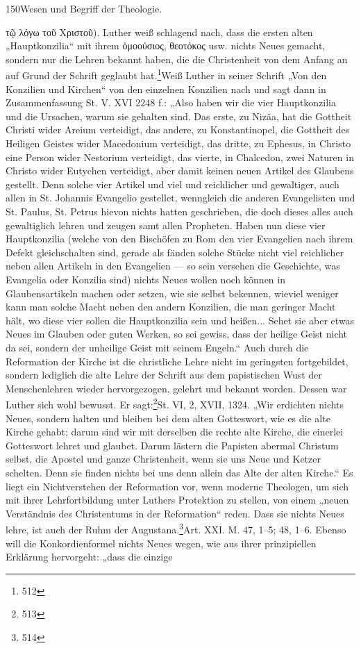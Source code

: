 150\hfill Wesen und Begriff der Theologie.\par{} τῷ λόγω τοῦ Χριστοῦ). Luther weiß schlagend nach, dass die ersten alten „Hauptkonzilia“ mit ihrem ὁμοούσιος, θεοτόκος usw. nichts Neues gemacht, sondern nur die Lehren bekannt haben, die die Christenheit von dem Anfang an auf Grund der Schrift geglaubt hat.\footnote{512}{Weiß Luther in seiner Schrift „Von den Konzilien und Kirchen“ von den einzelnen Konzilien nach und sagt dann in Zusammenfassung St. V. XVI 2248 f.: „Also haben wir die vier Hauptkonzilia und die Ursachen, warum sie gehalten sind. Das erste, zu Nizäa, hat die Gottheit Christi wider Areium verteidigt, das andere, zu Konstantinopel, die Gottheit des Heiligen Geistes wider Macedonium verteidigt, das dritte, zu Ephesus, in Christo eine Person wider Nestorium verteidigt, das vierte, in Chalcedon, zwei Naturen in Christo wider Eutychen verteidigt, aber damit keinen neuen Artikel des Glaubens gestellt. Denn solche vier Artikel und viel und reichlicher und gewaltiger, auch allen in St. Johannis Evangelio gestellet, wenngleich die anderen Evangelisten und St. Paulus, St. Petrus hievon nichts hatten geschrieben, die doch dieses alles auch gewaltiglich lehren und zeugen samt allen Propheten. Haben nun diese vier Hauptkonzilia (welche von den Bischöfen zu Rom den vier Evangelien nach ihrem Defekt gleichschalten sind, gerade als fänden solche Stücke nicht viel reichlicher neben allen Artikeln in den Evangelien — so sein versehen die Geschichte, was Evangelia oder Konzilia sind) nichts Neues wollen noch können in Glaubensartikeln machen oder setzen, wie sie selbst bekennen, wieviel weniger kann man solche Macht neben den andern Konzilien, die man geringer Macht hält, wo diese vier sollen die Hauptkonzilia sein und heißen... Sehet sie aber etwas Neues im Glauben oder guten Werken, so sei gewiss, dass der heilige Geist nicht da sei, sondern der unheilige Geist mit seinem Engeln.“} Auch durch die Reformation der Kirche ist die christliche Lehre nicht im geringsten fortgebildet, sondern lediglich die alte Lehre der Schrift aus dem papistischen Wust der Menschenlehren wieder hervorgezogen, gelehrt und bekannt worden. Dessen war Luther sich wohl bewusst. Er sagt:\footnote{513}{St. VI, 2, XVII, 1324.} „Wir erdichten nichts Neues, sondern halten und bleiben bei dem alten Gotteswort, wie es die alte Kirche gehabt; darum sind wir mit derselben die rechte alte Kirche, die einerlei Gotteswort lehret und glaubet. Darum lästern die Papisten abermal Christum selbst, die Apostel und ganze Christenheit, wenn sie uns Neue und Ketzer schelten. Denn sie finden nichts bei uns denn allein das Alte der alten Kirche.“ Es liegt ein Nichtverstehen der Reformation vor, wenn moderne Theologen, um sich mit ihrer Lehrfortbildung unter Luthers Protektion zu stellen, von einem „neuen Verständnis des Christentums in der Reformation“ reden. Dass sie nichts Neues lehre, ist auch der Ruhm der Augustana.\footnote{514}{Art. XXI. M. 47, 1–5; 48, 1–6.} Ebenso will die Konkordienformel nichts Neues wegen, wie aus ihrer prinzipiellen Erklärung hervorgeht: „dass die einzige